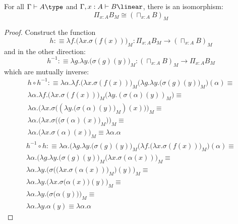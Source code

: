 \begin{thm}\label{M-sqcap}
  For all $\Gamma \vdash A \type$ and $\Gamma, x : A \vdash B \linear$, there is an isomorphism:
  \[
    \Pi_{x : A}B_M \cong (\sqcap_{x : A}B)_M
  \]
  \begin{proof}
    Construct the function 
    \[
      h :\equiv \lambda f. \big ( \lambda x. \sigma(f(x))\big)_M : \Pi_{x : A}B_M \to (\sqcap_{x : A}B)_M
    \]
    and in the other direction:
    \[
      h^{-1} :\equiv \lambda g. \lambda y. \big (\sigma(g)(y)\big )_M  : (\sqcap_{x : A}B)_M \to \Pi_{x :A}B_M
    \]
    which are mutually inverse:
    \[
      \begin{split}
        h \circ h^{-1} : \equiv \lambda \alpha . \lambda f. \big (\lambda x. \sigma(f(x)) \big)_M \Big (\lambda g. \lambda y. \big (\sigma(g)(y)\big )_M  \Big ) (\alpha) \equiv \\
        \lambda \alpha . \lambda f. \big ( \lambda x. \sigma(f(x)) \big )_M \big (\lambda y. (\sigma(\alpha)(y))_M \big ) \equiv \\
        \lambda \alpha . \Big (\lambda x. \sigma \Big ((\lambda y. \big (\sigma(\alpha)(y)\big )_M)(x)\Big ) \Big )_M \equiv \\
        \lambda \alpha . \Big (\lambda x. \sigma \Big (\big (\sigma(\alpha)(x)\big )_M\Big ) \Big )_M \equiv \\
        \lambda \alpha . \Big (\lambda x. \sigma(\alpha)(x) \Big )_M \equiv
        \lambda \alpha. \alpha
      \end{split}
    \]
    \[
      \begin{split}
        h^{-1} \circ h : \equiv \lambda \alpha . (\lambda g. \lambda y. \big (\sigma(g)(y)\big )_M   \Big (\lambda f. \big (\lambda x. \sigma(f(x)) \big)_M \Big ) (\alpha) \equiv \\
       \lambda \alpha . (\lambda g. \lambda y. \big (\sigma(g)(y)\big )_M   \big (\lambda x. \sigma(\alpha(x)) \big)_M \equiv \\
       \lambda \alpha . \lambda y. \big (\sigma \Big (\big (\lambda x. \sigma(\alpha(x)) \big)_M \Big )(y)\big )_M    \equiv \\
       \lambda \alpha . \lambda y. \big ( \lambda x. \sigma \big (\alpha(x) \big)(y)\big )_M    \equiv \\
       \lambda \alpha . \lambda y. \big ( \sigma\big (\alpha(y) \big ) \big )_M    \equiv \\
       \lambda \alpha . \lambda y. \alpha(y)   \equiv \lambda \alpha. \alpha
      \end{split}
    \]
  \end{proof}
\end{thm}
